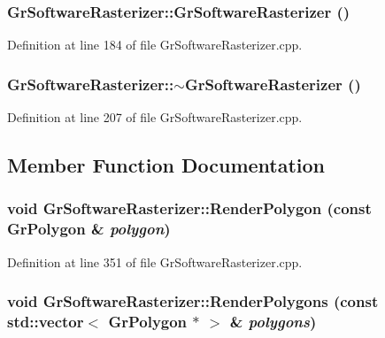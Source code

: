 \begin{CompactItemize}
{\subsubsection[{GrSoftwareRasterizer}]{\setlength{\rightskip}{0pt plus 5cm}GrSoftwareRasterizer::GrSoftwareRasterizer ()}}
\label{class_gr_software_rasterizer_4152bc0ee54f65d67451793cace04326}




Definition at line 184 of file GrSoftwareRasterizer.cpp.\hypertarget{class_gr_software_rasterizer_374f835befa73886edbfa0888635f636}{
\subsubsection[{$\sim$GrSoftwareRasterizer}]{\setlength{\rightskip}{0pt plus 5cm}GrSoftwareRasterizer::$\sim$GrSoftwareRasterizer ()}}
\label{class_gr_software_rasterizer_374f835befa73886edbfa0888635f636}




Definition at line 207 of file GrSoftwareRasterizer.cpp.

\subsection{Member Function Documentation}
\hypertarget{class_gr_software_rasterizer_af148346dfc9a809ba804df800965bfa}{
\subsubsection[{RenderPolygon}]{\setlength{\rightskip}{0pt plus 5cm}void GrSoftwareRasterizer::RenderPolygon (const {\bf GrPolygon} \& {\em polygon})}}
\label{class_gr_software_rasterizer_af148346dfc9a809ba804df800965bfa}




Definition at line 351 of file GrSoftwareRasterizer.cpp.\hypertarget{class_gr_software_rasterizer_51c764b2c87c4bce658c9e57d772fb12}{
\subsubsection[{RenderPolygons}]{\setlength{\rightskip}{0pt plus 5cm}void GrSoftwareRasterizer::RenderPolygons (const std::vector$<$ {\bf GrPolygon} $\ast$ $>$ \& {\em polygons})}}
\label{class_gr_software_rasterizer_51c764b2c87c4bce658c9e57d772fb12}





\end{CompactItemize}
